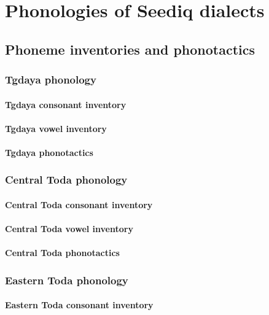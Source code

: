 \chapter{Phonologies of Seediq dialects}\label{ch3}
\lipsum[1]

\section{Phoneme inventories and phonotactics}

\subsection{Tgdaya phonology}
\lipsum[1]

\subsubsection{Tgdaya consonant inventory}
\subsubsection{Tgdaya vowel inventory}
\subsubsection{Tgdaya phonotactics}

\subsection{Central Toda phonology}
\lipsum[1]

\subsubsection{Central Toda consonant inventory}
\subsubsection{Central Toda vowel inventory}
\subsubsection{Central Toda phonotactics}

\subsection{Eastern Toda phonology}
\lipsum[1]

\subsubsection{Eastern Toda consonant inventory}
